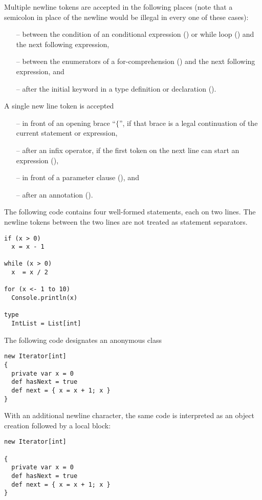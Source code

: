 Multiple newline tokens are accepted in the following places (note
that a semicolon in place of the newline would be illegal in every one
of these cases):
\begin{itemize}
\item[--]
between the condition of an conditional expression
() or while loop () and the next
following expression,
\item[--]
between the enumerators of a for-comprehension ()
and the next following expression, and
\item[--]
after the initial \lstinline@type@ keyword in a type definition or
declaration ().
\end{itemize}
A single new line token is accepted
\begin{itemize}
\item[--] 
  in front of an opening brace ``$\{$'', if that brace is a legal
  continuation of the current statement or expression,
\item[--]
  after an infix operator, if the first token on the next line can
  start an expression (),
\item[--]
  in front of a parameter clause (), and
\item[--]
  after an annotation ().
\end{itemize}  

\example The following code contains four well-formed statements, each
on two lines. The newline tokens between the two lines are not
treated as statement separators.
\begin{lstlisting}
if (x > 0)
  x = x - 1

while (x > 0)
  x  = x / 2

for (x <- 1 to 10)
  Console.println(x)

type
  IntList = List[int]
\end{lstlisting}

\example The following code designates an anonymous class
\begin{lstlisting}
new Iterator[int] 
{
  private var x = 0
  def hasNext = true
  def next = { x = x + 1; x }
}
\end{lstlisting}

With an additional newline character, the same code is interpreted as
an object creation followed by a local block:

\begin{lstlisting}
new Iterator[int] 

{
  private var x = 0
  def hasNext = true
  def next = { x = x + 1; x }
}
\end{lstlisting}

